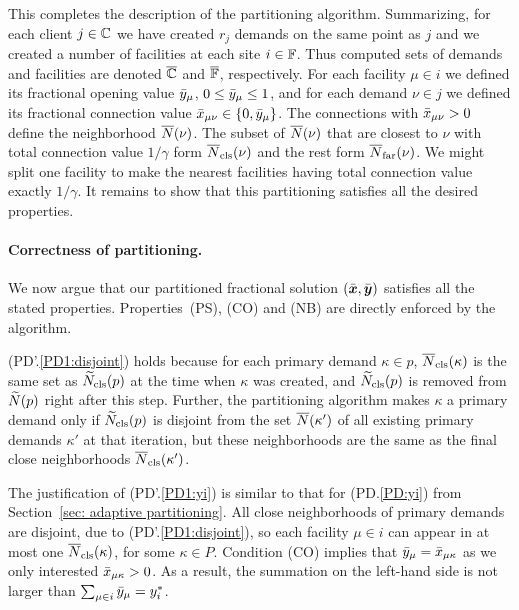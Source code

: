 This completes the description of the partitioning
algorithm. Summarizing, for each client $j\in\mathbb{C}$ we have
created $r_j$ demands on the same point as $j$ and we created a number
of facilities at each site $i\in\mathbb{F}$. Thus computed sets of
demands and facilities are denoted $\overline{\mathbb{C}}$ and $\overline{\mathbb{F}}$,
respectively.  For each facility $\mu\in i$ we defined its fractional
opening value ${\bar y}_\mu$, $0\le {\bar y}_\mu\le 1$, and for each demand
$\nu\in j$ we defined its fractional connection value
${\bar x}_{\mu\nu}\in { \left\{ 0,{\bar y}_\mu \right\} }$.  The connections with
${\bar x}_{\mu\nu} > 0$ define the neighborhood ${\overline{N}}(\nu)$. The subset
of ${\overline{N}}(\nu)$ that are closest to $\nu$ with total connection value
$1/\gamma$ form ${\overline{N}}_{\text{cls}}(\nu)$ and the rest form
${\overline{N}}_{\text{far}}(\nu)$. We might split one facility to make the nearest
facilities having total connection value exactly $1/\gamma$.  It
remains to show that this partitioning satisfies all the desired
properties.


\medskip
\paragraph{Correctness of partitioning.}
We now argue that our partitioned fractional solution $(\bar{\boldsymbol{x}},\bar{\boldsymbol{y}})$
satisfies all the stated properties. Properties~(PS), (CO) and (NB) are
directly enforced by the algorithm.

(PD'.\ref{PD1:disjoint}) holds because for each primary demand
$\kappa\in p$, ${\overline{N}}_{\text{cls}}(\kappa)$ is the same set as
${\widetilde N}_{\text{cls}}(p)$ at the time when $\kappa$ was created, and
${\widetilde N}_{\text{cls}}(p)$ is removed from ${\widetilde N}(p)$ right after this
step. Further, the partitioning algorithm makes $\kappa$ a primary
demand only if ${\widetilde N}_{\text{cls}}(p)$ is disjoint from the set
${\overline{N}}(\kappa')$ of all existing primary demands $\kappa'$ at that
iteration, but these neighborhoods are the same as the final close
neighborhoods ${\overline{N}}_{\text{cls}}(\kappa')$.

The justification of (PD'.\ref{PD1:yi}) is similar to that for
(PD.\ref{PD:yi}) from Section~\ref{sec: adaptive partitioning}. All
close neighborhoods of primary demands are disjoint, due to
(PD'.\ref{PD1:disjoint}), so each facility $\mu \in i$ can appear in
at most one ${\overline{N}}_{\text{cls}}(\kappa)$, for some $\kappa\in P$. Condition
(CO) implies that ${\bar y}_{\mu} = {\bar x}_{\mu\kappa}$ as we only
interested ${\bar x}_{\mu\kappa} > 0$. As a result, the summation on the
left-hand side is not larger than $\sum_{\mu\in i}{\bar y}_{\mu} =
y_i^\ast$.

